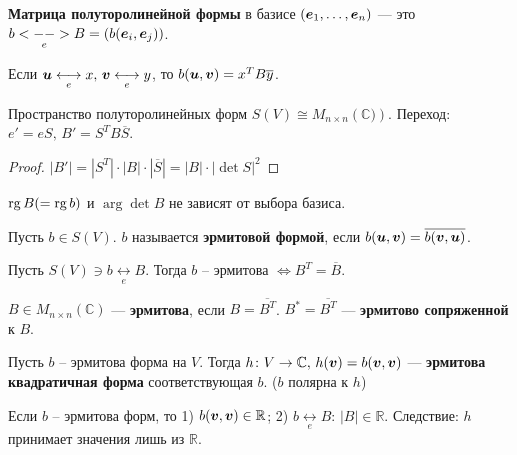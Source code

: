 \begin{to_def} 
	\textbf{Матрица полуторолинейной формы} в базисе $(\mbox{\boldmath $e$}_1,\ldots,\mbox{\boldmath $e$}_n)$ --- это $b \underset{e}{<-->} B = (b(\mbox{\boldmath $e$}_i, \mbox{\boldmath $e$}_j))$. 

	Если $\mbox{\boldmath $u$} \underset{e}{\longleftrightarrow} x, \, \mbox{\boldmath $v$} \underset{e}{\longleftrightarrow} y$, то $b(\mbox{\boldmath $u$},\mbox{\boldmath $v$}) = x^T B \overline{y}$.
\end{to_def}

\begin{to_thr} 
	Пространство полуторолинейных форм $S(V) \cong M_{n\times n}(\mathbb{C)})$. Переход: $e' = e S, \, B' = S^T B \overline{S}$.
\end{to_thr}

\begin{proof}
	$|B'| = |S^T| \cdot |B| \cdot |\overline{S}| = |B| \cdot |\det S|^2$
\end{proof}

\begin{to_con}
	$\mathop{\mathrm{rg}}\nolimits B(=\mathop{\mathrm{rg}}\nolimits b)$ и $\arg \det B$ не зависят от выбора базиса. 
\end{to_con}

\begin{to_def} 
	Пусть $b \in S(V)$. $b$ называется \textbf{эрмитовой формой}, если $b(\mbox{\boldmath $u$},\mbox{\boldmath $v$}) = \overline{b(\mbox{\boldmath $v$},\mbox{\boldmath $u$})}$.   
\end{to_def}

\begin{to_lem}
	Пусть $S(V) \ni b \underset{e}{\longleftrightarrow} B$. Тогда $b$ -- эрмитова $\Longleftrightarrow B^T = \overline{B}$.
\end{to_lem}

\begin{to_def} 
	$B \in M_{n \times n}(\mathbb{C})$ --- \textbf{эрмитова}, если $B = \overline{B^T}$. $B^* = \overline{B^T}$ --- \textbf{эрмитово сопряженной } к $B$.
\end{to_def}

\begin{to_def}
	Пусть $b$ -- эрмитова форма на $V$. Тогда $h \colon V \to \mathbb{C}, \, h(\mbox{\boldmath $v$}) = b(\mbox{\boldmath $v$},\mbox{\boldmath $v$})$ --- \textbf{эрмитова квадратичная форма} соответствующая $b$. ($b$ полярна к $h$)
\end{to_def}
	
\begin{to_lem}
	Если $b$ -- эрмитова форм, то 1) $b (\mbox{\boldmath $v$},\mbox{\boldmath $v$}) \in \mathbb{R}$; 2) $b \underset{e}{\longleftrightarrow} B:\, |B| \in \mathbb{R}$.	Следствие: $h$ принимает значения лишь из $\mathbb{R}$.
\end{to_lem}

